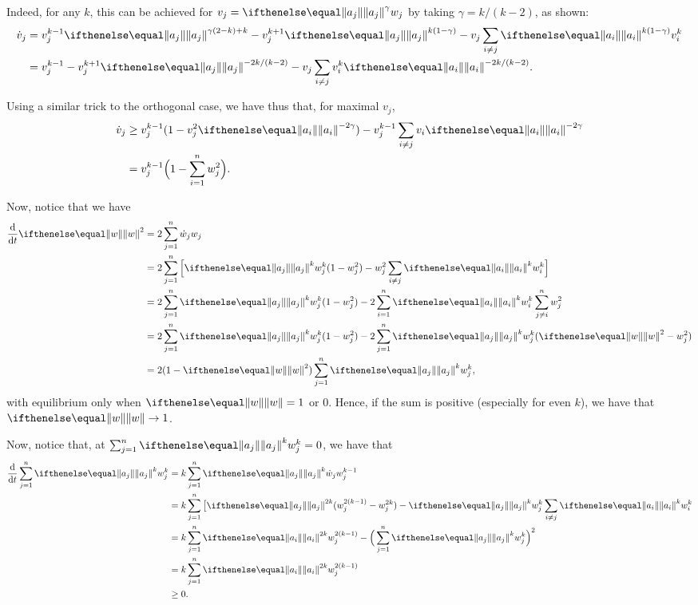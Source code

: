 \documentclass{hw-scrartcl}
\begin{document}
Indeed, for any \(k\), this can be achieved for \(v_j = \norm{a_j}^\gamma w_j\) by taking \(\gamma = k/(k-2)\), as shown:
\begin{align*}
  \dot{v}_j
  &= v_j^{k-1} \norm{a_j}^{\gamma(2-k) + k} - v_j^{k+1} \norm{a_j}^{k(1-\gamma)} - v_j \sum_{i \neq j} \norm{a_i}^{k(1-\gamma)} v_i^k \\
  &= v_j^{k-1}  - v_j^{k+1}\norm{a_j}^{-2k/(k-2)} - v_j \sum_{i\neq j} v_i^k \norm{a_i}^{-2k/(k-2)}.
\end{align*}

Using a similar trick to the orthogonal case, we have thus that, for maximal \(v_j\),
\begin{align*}
  \dot{v}_j
  &\geq v_j^{k-1}(1 - v_j^2 \norm{a_i}^{-2\gamma}) - v_j^{k-1} \sum_{i\neq j} v_i \norm{a_i}^{-2\gamma} \\
  &= v_j^{k-1} \Big(1 - \sum_{i=1}^n w_j^2\Big).
\end{align*}

Now, notice that we have
\begin{align*}
  \deriv{}{t} \norm{w}^2
  &= 2\sum_{j=1}^n \dot{w}_j w_j \\
  &= 2\sum_{j=1}^n \Big[\norm{a_j}^k w_j^k(1 - w_j^2) - w_j^2 \sum_{i\neq j} \norm{a_i}^k w_i^k\Big] \\
  &= 2\sum_{j=1}^n \norm{a_j}^k w_j^k(1 - w_j^2) - 2\sum_{i=1}^n \norm{a_i}^k w_i^k \sum_{j\neq i}^n w_j^2 \\
  &= 2\sum_{j=1}^n \norm{a_j}^k w_j^k(1 - w_j^2) - 2\sum_{j=1}^n \norm{a_j}^k w_j^k(\norm{w}^2 - w_j^2) \\
  &= 2(1 - \norm{w}^2)\sum_{j=1}^n \norm{a_j}^k w_j^k,
\end{align*}
with equilibrium only when \(\norm{w} = 1\) or \(0\). Hence, if the sum is positive (especially for even \(k\)), we have that \(\norm{w} \rightarrow 1\).

Now, notice that, at \(\sum_{j=1}^n \norm{a_j}^k w_j^k = 0\), we have that
\begin{align*}
  \deriv{}{t} \sum_{j=1}^n \norm{a_j}^k w_j^k
  &= k\sum_{j=1}^n \norm{a_j}^k\dot{w}_j w_j^{k-1} \\
  &= k\sum_{j=1}^n \big[ \norm{a_j}^{2k}(w_j^{2(k-1)}  - w_j^{2k}) - \norm{a_j}^k w_j^k \sum_{i\neq j} \norm{a_i}^k w_i^k \\
  &= k\sum_{j=1}^n \norm{a_i}^{2k} w_j^{2(k-1)} - \Big(\sum_{j=1}^n \norm{a_j}^k w_j^k\Big)^2 \\
  &= k\sum_{j=1}^n \norm{a_i}^{2k} w_j^{2(k-1)} \\
  &\geq 0.
\end{align*}
\end{document}
